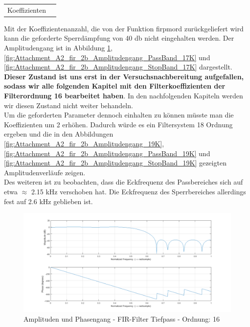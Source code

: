 \begin{table}
	\begin{tabular}{c | c}
		Koeffizienten
	\end{tabular}
\end{table}





\noindent Mit der Koeffizientenanzahl, die von der Funktion firpmord zurückgeliefert wird kann die geforderte Sperrdämpfung von 40 db nicht eingehalten werden. Der Amplitudengang ist in Abbildung \ref{fig:Attachment_A2_fir_2b_Amplitudengang_17K}, \ref{fig:Attachment_A2_fir_2b_Amplitudengang_PassBand_17K} und \ref{fig:Attachment_A2_fir_2b_Amplitudengang_StopBand_17K} dargestellt. \textbf{Dieser Zustand ist uns erst in der Versuchsnachbereitung aufgefallen, sodass wir alle folgenden Kapitel mit den Filterkoeffizienten der Filterordnung 16 bearbeitet haben}. In den nachfolgenden Kapiteln werden wir diesen Zustand nicht weiter behandeln.\\
Um die geforderten Parameter dennoch einhalten zu können müsste man die Koeffizienten um 2 erhöhen. Dadurch würde es ein Filtersystem 18 Ordnung ergeben und die in den Abbildungen \ref{fig:Attachment_A2_fir_2b_Amplitudengang_19K}, \ref{fig:Attachment_A2_fir_2b_Amplitudengang_PassBand_19K} und \ref{fig:Attachment_A2_fir_2b_Amplitudengang_StopBand_19K} gezeigten Amplitudenverläufe zeigen.\\
Des weiteren ist zu beobachten, dass die Eckfrequenz des Passbereiches sich auf etwa $\approx$ 2.15 kHz verschoben hat. Die Eckfrequenz des Sperrbereiches allerdings fest auf 2.6 kHz geblieben ist.

\begin{figure}[H]
\centering
\includegraphics[width=1.0\linewidth]{./Bilder/Attachment_A2_fir_2b_Amplitudengang_17K}
\caption{Amplituden und Phasengang - FIR-Filter Tiefpass - Ordnung: 16}
\label{fig:Attachment_A2_fir_2b_Amplitudengang_17K}
\end{figure}


